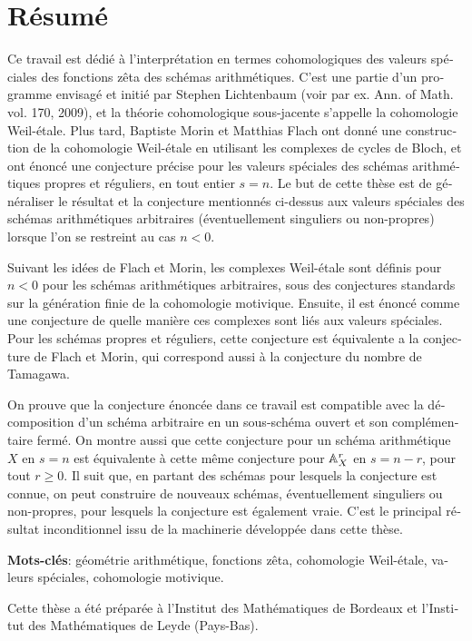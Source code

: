 \chapter*{Résumé}

\begin{otherlanguage}{french}
  Ce travail est dédié à l'interprétation en termes cohomologiques des valeurs
  spéciales des fonctions zêta des schémas arithmétiques. C'est une partie d'un
  programme envisagé et initié par Stephen Lichtenbaum (voir par ex.
  Ann. of Math. vol. 170, 2009), et la théorie cohomologique sous-jacente
  s'appelle la cohomologie Weil-étale. Plus tard, Baptiste Morin et Matthias
  Flach ont donné une construction de la cohomologie Weil-étale en utilisant les
  complexes de cycles de Bloch, et ont énoncé une conjecture précise pour les
  valeurs spéciales des schémas arithmétiques propres et réguliers, en tout
  entier $s=n$. Le but de cette thèse est de généraliser le résultat et la
  conjecture mentionnés ci-dessus aux valeurs spéciales des schémas
  arithmétiques arbitraires (éventuellement singuliers ou non-propres) lorsque
  l'on se restreint au cas $n<0$.

  Suivant les idées de Flach et Morin, les complexes Weil-étale sont définis
  pour $n < 0$ pour les schémas arithmétiques arbitraires, sous des conjectures
  standards sur la génération finie de la cohomologie motivique. Ensuite, il est
  énoncé comme une conjecture de quelle manière ces complexes sont liés aux
  valeurs spéciales. Pour les schémas propres et réguliers, cette conjecture est
  équivalente a la conjecture de Flach et Morin, qui correspond aussi à la
  conjecture du nombre de Tamagawa.

  On prouve que la conjecture énoncée dans ce travail est compatible avec la
  décomposition d'un schéma arbitraire en un sous-schéma ouvert et son
  complémentaire fermé. On montre aussi que cette conjecture pour un schéma
  arithmétique $X$ en $s=n$ est équivalente à cette même conjecture pour
  $\AA^r_X$ en $s=n-r$, pour tout $r\geq 0$. Il suit que, en partant des schémas
  pour lesquels la conjecture est connue, on peut construire de nouveaux
  schémas, éventuellement singuliers ou non-propres, pour lesquels la conjecture
  est également vraie. C'est le principal résultat inconditionnel issu de la
  machinerie développée dans cette thèse.

  \ifdefined\dutch
  \else
  \pagebreak
  \noindent\textbf{Mots-clés}: géométrie arithmétique, fonctions zêta,
  cohomologie Weil-étale, valeurs spéciales, cohomologie motivique.

  Cette thèse a été préparée à l'Institut des Mathématiques de Bordeaux et
  l'Institut des Mathématiques de Leyde (Pays-Bas).
  \fi
\end{otherlanguage}
